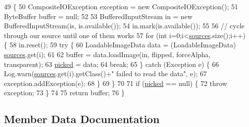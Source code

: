 \begin{DoxyCode}
49                                                                                                            
                      \{
50         CompositeIOException exception = \textcolor{keyword}{new} CompositeIOException();
51         ByteBuffer buffer = null;
52         
53         BufferedInputStream in = \textcolor{keyword}{new} BufferedInputStream(is, is.available());
54         in.mark(is.available());
55         
56         \textcolor{comment}{// cycle through our source until one of them works}
57         \textcolor{keywordflow}{for} (\textcolor{keywordtype}{int} i=0;i<\mbox{\hyperlink{classorg_1_1newdawn_1_1slick_1_1opengl_1_1_composite_image_data_a620f0a2292b907b7a3418d95d91e422c}{sources}}.size();i++) \{
58             in.reset();
59             \textcolor{keywordflow}{try} \{
60                 LoadableImageData data = (LoadableImageData) \mbox{\hyperlink{classorg_1_1newdawn_1_1slick_1_1opengl_1_1_composite_image_data_a620f0a2292b907b7a3418d95d91e422c}{sources}}.get(i);
61                 
62                 buffer = data.loadImage(in, flipped, forceAlpha, transparent);
63                 \mbox{\hyperlink{classorg_1_1newdawn_1_1slick_1_1opengl_1_1_composite_image_data_a7238cbb20cc08b68a29935b4bc222da7}{picked}} = data;
64                 \textcolor{keywordflow}{break};
65             \} \textcolor{keywordflow}{catch} (Exception e) \{
66                 Log.warn(\mbox{\hyperlink{classorg_1_1newdawn_1_1slick_1_1opengl_1_1_composite_image_data_a620f0a2292b907b7a3418d95d91e422c}{sources}}.get(i).getClass()+\textcolor{stringliteral}{" failed to read the data"}, e);
67                 exception.addException(e);
68             \}
69         \}
70         
71         \textcolor{keywordflow}{if} (\mbox{\hyperlink{classorg_1_1newdawn_1_1slick_1_1opengl_1_1_composite_image_data_a7238cbb20cc08b68a29935b4bc222da7}{picked}} == null) \{
72             \textcolor{keywordflow}{throw} exception;
73         \}
74         
75         \textcolor{keywordflow}{return} buffer;
76     \}
\end{DoxyCode}


\subsection{Member Data Documentation}
\mbox{\label{classorg_1_1newdawn_1_1slick_1_1opengl_1_1_composite_image_data_a7238cbb20cc08b68a29935b4bc222da7}} 
